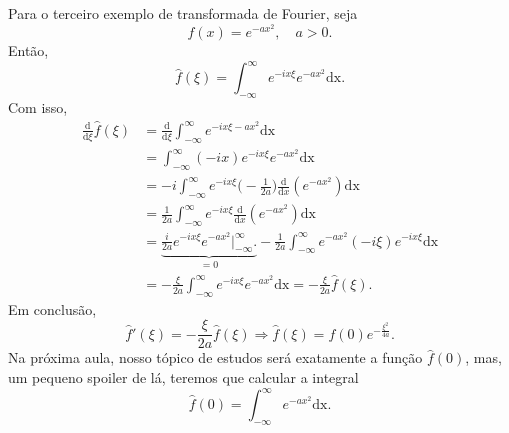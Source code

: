 \documentclass[../pde_notes.tex]{subfiles}
\begin{document}
\begin{example}
	Para o terceiro exemplo de transformada de Fourier, seja
	\[
		f(x) = e^{-ax^{2}},\quad a > 0.
	\]
	Então,
	\[
		\hat{f}(\xi ) = \int_{-\infty}^{\infty}e^{-ix\xi }e^{-ax^{2}} \mathrm{dx}.
	\]
	Com isso,
	\begin{align*}
		\frac{\mathrm{d}}{\mathrm{d}\xi }\hat{f}(\xi ) & = \frac{\mathrm{d}}{\mathrm{d}\xi }\int_{-\infty}^{\infty}e^{-ix\xi -ax^{2}} \mathrm{dx}                                                                                \\
		                                               & = \int_{-\infty}^{\infty}(-ix)e^{-ix\xi }e^{-ax^{2}} \mathrm{dx}                                                                                                        \\
		                                               & = -i \int_{-\infty}^{\infty}e^{-ix\xi }\biggl(-\frac{1}{2a}\biggr)\frac{\mathrm{d}}{\mathrm{d}x}(e^{-ax^{2}}) \mathrm{dx}                                               \\
		                                               & =\frac{1}{2a}\int_{-\infty}^{\infty}e^{-ix\xi }\frac{\mathrm{d}}{\mathrm{d}x}(e^{-ax^{2}}) \mathrm{dx}                                                                  \\
		                                               & = \underbrace{\frac{i}{2a}e^{-ix\xi }e^{-ax^{2}}\biggl|_{-\infty}^{\infty}\biggr.}_{=0} - \frac{1}{2a}\int_{-\infty}^{\infty}e^{-ax^{2}}(-i\xi )e^{-ix\xi } \mathrm{dx} \\
		                                               & = -\frac{\xi }{2a}\int_{-\infty}^{\infty}e^{-ix\xi }e^{-ax^{2}} \mathrm{dx} = - \frac{\xi }{2a}\hat{f}(\xi ).
	\end{align*}
	Em conclusão,
	\[
		\hat{f}'(\xi ) = -\frac{\xi }{2a}\hat{f}(\xi ) \Rightarrow \hat{f}(\xi ) = f(0) e^{-\frac{\xi^{2}}{4a}}.
	\]
	\hypertarget{last_class_21}{Na próxima aula}, nosso tópico de estudos será exatamente a função \(\hat{f}(0)\), mas, um pequeno spoiler de lá, teremos que calcular a integral
	\[
		\hat{f}(0) = \int_{-\infty}^{\infty}e^{-ax^{2}} \mathrm{dx}.
	\]
\end{example}
\end{document}
